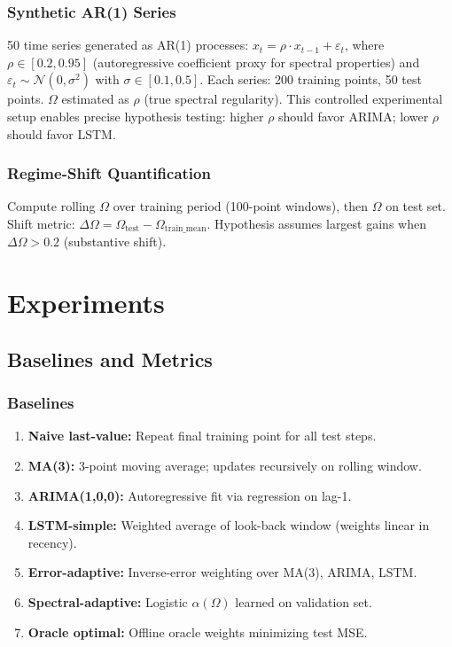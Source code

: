 \documentclass[11pt,letterpaper]{article}
\begin{document}
\subsubsection{Synthetic AR(1) Series}

50 time series generated as AR(1) processes: $x_t = \rho \cdot x_{t-1} + \varepsilon_t$, where $\rho \in [0.2, 0.95]$ (autoregressive coefficient proxy for spectral properties) and $\varepsilon_t \sim \mathcal{N}(0, \sigma^2)$ with $\sigma \in [0.1, 0.5]$. Each series: 200 training points, 50 test points. $\Omega$ estimated as $\rho$ (true spectral regularity). This controlled experimental setup enables precise hypothesis testing: higher $\rho$ should favor ARIMA; lower $\rho$ should favor LSTM.

\subsubsection{Regime-Shift Quantification}

Compute rolling $\Omega$ over training period (100-point windows), then $\Omega$ on test set. Shift metric: $\Delta\Omega = \Omega_{\text{test}} - \Omega_{\text{train\_mean}}$. Hypothesis assumes largest gains when $\Delta\Omega > 0.2$ (substantive shift).

\section{Experiments}

\subsection{Baselines and Metrics}

\subsubsection{Baselines}

\begin{enumerate}
  \item \textbf{Naive last-value:} Repeat final training point for all test steps.
  \item \textbf{MA(3):} 3-point moving average; updates recursively on rolling window.
  \item \textbf{ARIMA(1,0,0):} Autoregressive fit via regression on lag-1.
  \item \textbf{LSTM-simple:} Weighted average of look-back window (weights linear in recency).
  \item \textbf{Error-adaptive:} Inverse-error weighting over MA(3), ARIMA, LSTM.
  \item \textbf{Spectral-adaptive:} Logistic $\alpha(\Omega)$ learned on validation set.
  \item \textbf{Oracle optimal:} Offline oracle weights minimizing test MSE.
\end{enumerate}
\end{document}
